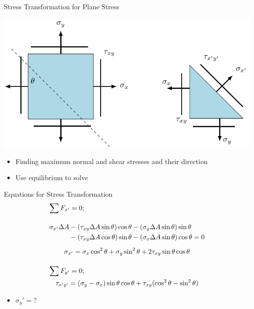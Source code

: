 \documentclass[10pt, svgnames]{beamer}
\begin{document}
\begin{frame}[label={sec:orga433dcc}]{Stress Transformation for Plane Stress}
\begin{center}
\includegraphics[width=.9\linewidth]{pictures/stress-trans.pdf}
\end{center}

\begin{itemize}
\item Finding maximum normal and shear stresses and their direction

\item Use equilibrium to solve
\end{itemize}
\end{frame}

\begin{frame}[label={sec:org29b0b25}]{Equations for Stress Transformation}
\begin{gather*}
  \sum F_{x'}  = 0; \hfill \\[1em]
  \begin{split}
    \sigma_{x'}\Delta A &- (\tau_{xy}\Delta A\sin \theta )\cos \theta  - (\sigma_y\Delta A\sin \theta )\sin \theta  \\
    &- (\tau_{xy}\Delta A\cos \theta )\sin \theta  - (\sigma_x\Delta A\sin \theta )\cos \theta  = 0
  \end{split} \nonumber \\[0.5em]
  \sigma_{x'} = \sigma_x\cos^2\theta  + \sigma_y\sin^2\theta  + 2\tau_{xy}\sin \theta \cos \theta  \\[1em]
  \sum F_{y'}  = 0; \hfill \\ 
  \tau_{x'y'} = (\sigma_y - \sigma_x)\sin \theta \cos \theta  + \tau_{xy}(\cos^2\theta  - \sin ^2\theta ) \\ 
\end{gather*}

\begin{itemize}
\item \(\sigma_y' = ?\)
\end{itemize}
\end{frame}
\end{document}
